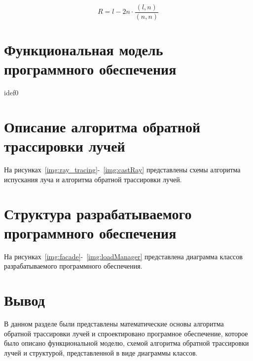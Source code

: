 \begin{equation}
	\label{reflect_ray}
	R = l - 2 n \cdot \frac{(l, n)}{(n, n)}
\end{equation}

\clearpage
\section{Функциональная модель программного обеспечения}
 idef0

\clearpage
\section{Описание алгоритма обратной трассировки лучей}
На рисунках~\ref{img:ray_tracing}-~\ref{img:castRay} представлены схемы алгоритма испускания луча и алгоритма обратной трассировки лучей.
\FloatBarrier
{}
\FloatBarrier
{}
\FloatBarrier


\clearpage
\section{Структура разрабатываемого программного обеспечения}
На рисунках~\ref{img:facade}-~\ref{img:loadManager} представлена диаграмма классов разрабатываемого программного обеспечения.
\FloatBarrier
{}
\FloatBarrier
{}
\FloatBarrier
{}
\FloatBarrier


\section*{Вывод}

В данном разделе были представлены математические основы алгоритма обратной трассировки лучей и спроектировано програмное обеспечение, которое было описано функциональной моделю, схемой алгоритма обратной трассировки лучей и структурой, представленной в виде диаграммы классов.

\clearpage
